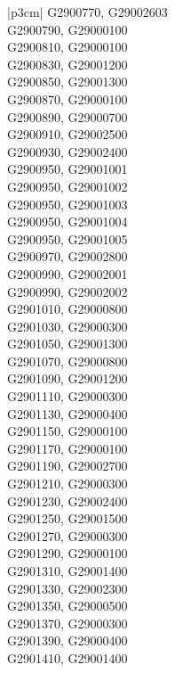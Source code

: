\begin{customLongTable}{ |p{3cm}| }
G2900770, G29002603 \\ \hline
G2900790, G29000100 \\ \hline
G2900810, G29000100 \\ \hline
G2900830, G29001200 \\ \hline
G2900850, G29001300 \\ \hline
G2900870, G29000100 \\ \hline
G2900890, G29000700 \\ \hline
G2900910, G29002500 \\ \hline
G2900930, G29002400 \\ \hline
G2900950, G29001001 \\ \hline
G2900950, G29001002 \\ \hline
G2900950, G29001003 \\ \hline
G2900950, G29001004 \\ \hline
G2900950, G29001005 \\ \hline
G2900970, G29002800 \\ \hline
G2900990, G29002001 \\ \hline
G2900990, G29002002 \\ \hline
G2901010, G29000800 \\ \hline
G2901030, G29000300 \\ \hline
G2901050, G29001300 \\ \hline
G2901070, G29000800 \\ \hline
G2901090, G29001200 \\ \hline
G2901110, G29000300 \\ \hline
G2901130, G29000400 \\ \hline
G2901150, G29000100 \\ \hline
G2901170, G29000100 \\ \hline
G2901190, G29002700 \\ \hline
G2901210, G29000300 \\ \hline
G2901230, G29002400 \\ \hline
G2901250, G29001500 \\ \hline
G2901270, G29000300 \\ \hline
G2901290, G29000100 \\ \hline
G2901310, G29001400 \\ \hline
G2901330, G29002300 \\ \hline
G2901350, G29000500 \\ \hline
G2901370, G29000300 \\ \hline
G2901390, G29000400 \\ \hline
G2901410, G29001400 \\ \hline

\end{customLongTable}
